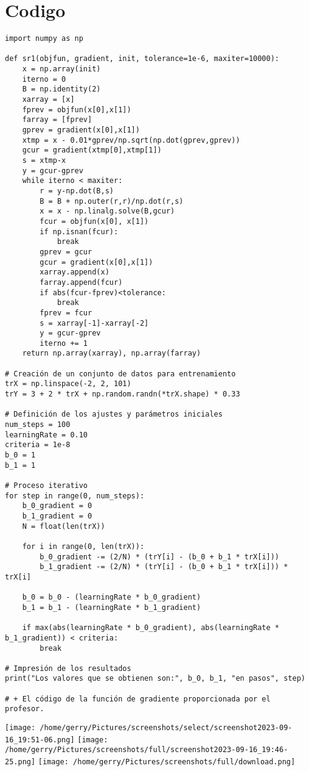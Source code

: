 \documentclass{article}
\begin{document}
\section*{Codigo}
\begin{verbatim}
import numpy as np

def sr1(objfun, gradient, init, tolerance=1e-6, maxiter=10000):
    x = np.array(init)
    iterno = 0
    B = np.identity(2)
    xarray = [x]
    fprev = objfun(x[0],x[1])
    farray = [fprev]
    gprev = gradient(x[0],x[1])
    xtmp = x - 0.01*gprev/np.sqrt(np.dot(gprev,gprev))
    gcur = gradient(xtmp[0],xtmp[1])
    s = xtmp-x
    y = gcur-gprev
    while iterno < maxiter:
        r = y-np.dot(B,s)
        B = B + np.outer(r,r)/np.dot(r,s)        
        x = x - np.linalg.solve(B,gcur)
        fcur = objfun(x[0], x[1])
        if np.isnan(fcur):
            break
        gprev = gcur
        gcur = gradient(x[0],x[1])
        xarray.append(x)
        farray.append(fcur)
        if abs(fcur-fprev)<tolerance:
            break
        fprev = fcur
        s = xarray[-1]-xarray[-2]
        y = gcur-gprev
        iterno += 1
    return np.array(xarray), np.array(farray)

# Creación de un conjunto de datos para entrenamiento
trX = np.linspace(-2, 2, 101)
trY = 3 + 2 * trX + np.random.randn(*trX.shape) * 0.33

# Definición de los ajustes y parámetros iniciales
num_steps = 100
learningRate = 0.10
criteria = 1e-8
b_0 = 1
b_1 = 1

# Proceso iterativo
for step in range(0, num_steps):
    b_0_gradient = 0
    b_1_gradient = 0
    N = float(len(trX))

    for i in range(0, len(trX)):
        b_0_gradient -= (2/N) * (trY[i] - (b_0 + b_1 * trX[i]))
        b_1_gradient -= (2/N) * (trY[i] - (b_0 + b_1 * trX[i])) * trX[i]
        
    b_0 = b_0 - (learningRate * b_0_gradient)
    b_1 = b_1 - (learningRate * b_1_gradient)

    if max(abs(learningRate * b_0_gradient), abs(learningRate * b_1_gradient)) < criteria:
        break
    
# Impresión de los resultados
print("Los valores que se obtienen son:", b_0, b_1, "en pasos", step)

# + El código de la función de gradiente proporcionada por el profesor.
\end{verbatim}

\begin{center}
    \texttt{[image: /home/gerry/Pictures/screenshots/select/screenshot2023-09-16\_19:51-06.png]}
    \texttt{[image: /home/gerry/Pictures/screenshots/full/screenshot2023-09-16\_19:46-25.png]}
    \texttt{[image: /home/gerry/Pictures/screenshots/full/download.png]}
\end{center}
\end{document}

